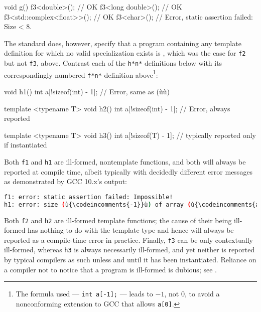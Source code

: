 \begin{emcppslisting}[emcppsbatch=e2]
void g()
{
    f3<double>();               // OK
    f3<long double>();          // OK
    f3<std::complex<float>>();  // OK
    f3<char>();                 // Error, static assertion failed: Size < 8.
}
\end{emcppslisting}

\noindent The standard does, however, specify that a program containing any
template definition for which no valid specialization exists is
, which was the case for
\lstinline!f2! but not \lstinline!f3!, above. Contrast each of the
\lstinline!h*!\lstinline[basicstyle=\ttfamily\itshape]!n!\lstinline!*! definitions below with its correspondingly numbered
\lstinline!f*!\lstinline[basicstyle=\ttfamily\itshape]!n!\lstinline!*!  definition above\footnote{The formula used --- \lstinline!int!~\lstinline!a[-1];! --- leads to $-1$, not $0$, to avoid a nonconforming extension to GCC that allows \lstinline!a[0]!.}:

\begin{emcppslisting}
void h1()
{
    int a[!sizeof(int) - 1];  // Error, same as (ù{}ù)
}

template <typename T>
void h2()
{
    int a[!sizeof(int) - 1];  // Error, always reported
}

template <typename T>
void h3()
{
    int a[!sizeof(T) - 1];    // typically reported only if instantiated
}
\end{emcppslisting}

\noindent Both \lstinline!f1! and \lstinline!h1! are ill-formed, nontemplate functions,
and both will always be reported at compile time, albeit typically with
decidedly different error messages as demonstrated by GCC 10.x's output:

\enlargethispage*{1ex}
\begin{lstlisting}[language=bash,style=plain]
f1: error: static assertion failed: Impossible!
h1: error: size (ù{\codeincomments{-1}}ù) of array (ù{\codeincomments{a}}ù) is negative
\end{lstlisting}

\noindent Both \lstinline!f2! and \lstinline!h2! are ill-formed template functions; the cause of their being ill-formed has nothing to do with the
template type and hence will always be reported as a compile-time error
in practice. Finally, \lstinline!f3! can be only contextually ill-formed,
whereas \lstinline!h3! is always necessarily ill-formed, and yet neither is
reported by typical compilers as such unless and until it has been
instantiated. Reliance on a compiler not to notice that a program is
ill-formed is dubious; see
.

